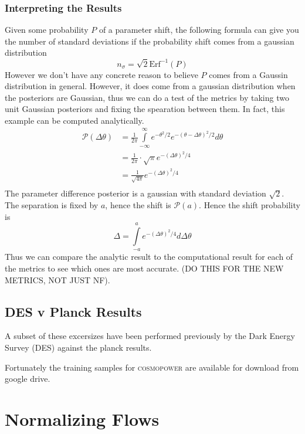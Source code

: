 \subsubsection{Interpreting the Results}
Given some probability $P$ of a parameter shift, the following formula can give you the number of standard deviations if the probability shift comes from a gaussian distribution
\begin{equation}
	n_\sigma = \sqrt{2} \text{Erf}^{-1}(P)
\end{equation}
However we don't have any concrete reason to believe $P$ comes from a Gaussin distribution in general. However, it does come from a gaussian distribution when the posteriors are Gaussian, thus we can do a test of the metrics by taking two unit Gaussian posteriors and fixing the spearation between them. In fact, this example can be computed analytically.
\begin{equation}
    \begin{split}
	\mathcal{P}(\Delta \theta) &= \frac{1}{2\pi} \int\limits_{-\infty}^{\infty} e^{-\theta^2/2} e^{-{(\theta-\Delta\theta)}^2/2}  d\theta \\
				  			   &= \frac{1}{2\pi} \cdot \sqrt{\pi} e^{-{(\Delta\theta)}^2/4}\\
				   			   &= \frac{1}{\sqrt{4\pi}}e^{-{(\Delta\theta)}^2/4}\\
    \end{split}
\end{equation}
The parameter difference posterior is a gaussian with standard deviation $\sqrt{2}$. The separation is fixed by $a$, hence the shift is $\mathcal{P}(a)$. Hence the shift probability is
\begin{equation}
	\Delta = \int\limits_{-a}^{a} e^{-{(\Delta\theta)}^2/4} d\Delta\theta
\end{equation}
Thus we can compare the analytic result to the computational result for each of the metrics to see which ones are most accurate. (DO THIS FOR THE NEW METRICS, NOT JUST NF).

\subsection{DES v Planck Results}
A subset of these excersizes have been performed previously by the Dark Energy Survey (DES) against the planck results.

Fortunately the training samples for \textsc{cosmopower} are available for download from google drive.

\section{Normalizing Flows}

